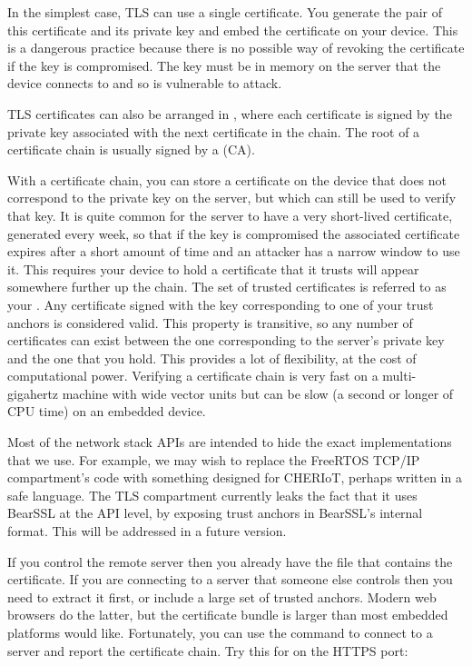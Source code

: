 In the simplest case, TLS can use a single certificate.
You generate the pair of this certificate and its private key and embed the certificate on your device.
This is a dangerous practice because there is no possible way of revoking the certificate if the key is compromised.
The key must be in memory on the server that the device connects to and so is vulnerable to attack.

TLS certificates can also be arranged in , where each certificate is signed by the private key associated with the next certificate in the chain.
The root of a certificate chain is usually signed by a  (CA).

With a certificate chain, you can store a certificate on the device that does not correspond to the private key on the server, but which can still be used to verify that key.
It is quite common for the server to have a very short-lived certificate, generated every week, so that if the key is compromised the associated certificate expires after a short amount of time and an attacker has a narrow window to use it.
This requires your device to hold a certificate that it trusts will appear somewhere further up the chain.
The set of trusted certificates is referred to as your .
Any certificate signed with the key corresponding to one of your trust anchors is considered valid.
This property is transitive, so any number of certificates can exist between the one corresponding to the server's private key and the one that you hold.
This provides a lot of flexibility, at the cost of computational power.
Verifying a certificate chain is very fast on a multi-gigahertz machine with wide vector units but can be slow (a second or longer of CPU time) on an embedded device.

\begin{note}
Most of the network stack APIs are intended to hide the exact implementations that we use.
For example, we may wish to replace the FreeRTOS TCP/IP compartment's code with something designed for CHERIoT, perhaps written in a safe language.
The TLS compartment currently leaks the fact that it uses BearSSL at the API level, by exposing trust anchors in BearSSL's internal format.
This will be addressed in a future version.
\end{note}

If you control the remote server then you already have the  file that contains the certificate.
If you are connecting to a server that someone else controls then you need to extract it first, or include a large set of trusted anchors.
Modern web browsers do the latter, but the certificate bundle is larger than most embedded platforms would like.
Fortunately, you can use the  command to connect to a server and report the certificate chain.
Try this for  on the HTTPS port:

